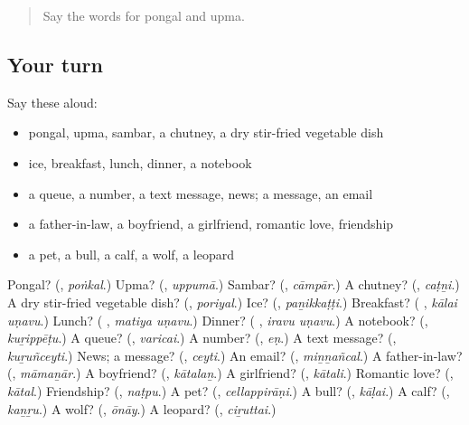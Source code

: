 \begin{quote}
Say the words for pongal and upma.
\end{quote}

\subsection*{Your turn}
Say these aloud:

\begin{itemize}
\raggedright
  \item pongal, upma, sambar, a chutney, a dry stir-fried vegetable dish
  \item ice, breakfast, lunch, dinner, a notebook
  \item a queue, a number, a text message, news; a message, an email
  \item a father-in-law, a boyfriend, a girlfriend, romantic love, friendship
  \item a pet, a bull, a calf, a wolf, a leopard
\end{itemize}

\begin{tcolorbox}[breakable,colback=teal!4,colframe=teal!35!black,title={Before you move on}]
Pongal? (\textbf{}, \emph{poṅkal}.) Upma? (\textbf{}, \emph{uppumā}.) Sambar? (\textbf{}, \emph{cāmpār}.) A chutney? (\textbf{}, \emph{caṭṉi}.) A dry stir-fried vegetable dish? (\textbf{}, \emph{poriyal}.) Ice? (\textbf{}, \emph{paṉikkaṭṭi}.) Breakfast? (\textbf{ }, \emph{kālai uṇavu}.) Lunch? (\textbf{ }, \emph{matiya uṇavu}.) Dinner? (\textbf{ }, \emph{iravu uṇavu}.) A notebook? (\textbf{}, \emph{kuṟippēṭu}.) A queue? (\textbf{}, \emph{varicai}.) A number? (\textbf{}, \emph{eṇ}.) A text message? (\textbf{}, \emph{kuṟuñceyti}.) News; a message? (\textbf{}, \emph{ceyti}.) An email? (\textbf{}, \emph{miṉṉañcal}.) A father-in-law? (\textbf{}, \emph{māmaṉār}.) A boyfriend? (\textbf{}, \emph{kātalaṉ}.) A girlfriend? (\textbf{}, \emph{kātali}.) Romantic love? (\textbf{}, \emph{kātal}.) Friendship? (\textbf{}, \emph{naṭpu}.) A pet? (\textbf{}, \emph{cellappirāṇi}.) A bull? (\textbf{}, \emph{kāḷai}.) A calf? (\textbf{}, \emph{kaṉṟu}.) A wolf? (\textbf{}, \emph{ōnāy}.) A leopard? (\textbf{}, \emph{ciṟuttai}.)
\end{tcolorbox}
